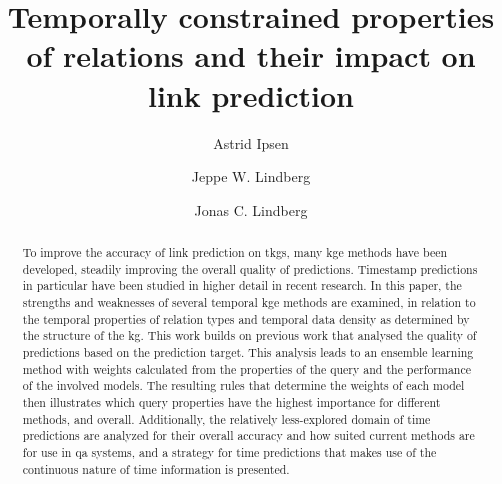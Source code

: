 \documentclass[sigconf,screen,nonacm=true]{acm_files/acmart}
\begin{document}
\fancyfoot[C]{\thepage/\pageref*{TotPages}}
\title{Temporally constrained properties of relations and their impact on link prediction}
\renewcommand{\footskip}{16mm}

\author{Astrid Ipsen}

\author{Jeppe W. Lindberg}

\author{Jonas C. Lindberg}
%
\begin{abstract}

To improve the accuracy of link prediction on \glspl{tkg}, many \gls{kge} methods have been developed, steadily improving the overall quality of predictions. Timestamp predictions in particular have been studied in higher detail in recent research. In this paper, the strengths and weaknesses of several temporal \gls{kge} methods are examined, in relation to the temporal properties of relation types and temporal data density as determined by the structure of the \gls{kg}. This work builds on previous work that analysed the quality of predictions based on the prediction target. This analysis leads to an ensemble learning method with weights calculated from the properties of the query and the performance of the involved models. The resulting rules that determine the weights of each model then illustrates which query properties have the highest importance for different methods, and overall. Additionally, the relatively less-explored domain of time predictions are analyzed for their overall accuracy and how suited current methods are for use in \gls{qa} systems, and a strategy for time predictions that makes use of the continuous nature of time information is presented.
\end{abstract}
\end{document}
